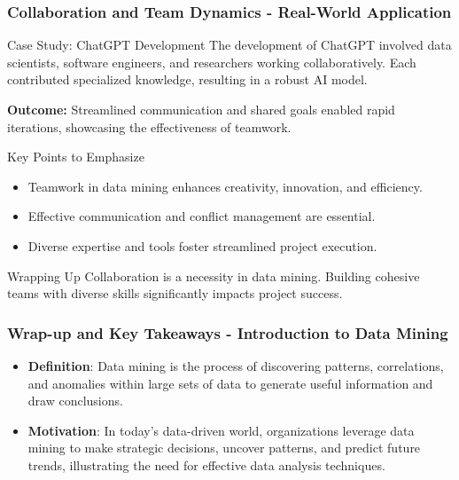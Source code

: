 \documentclass[aspectratio=169]{beamer}
\begin{document}
\begin{frame}[fragile]
    \frametitle{Collaboration and Team Dynamics - Real-World Application}
    \begin{block}{Case Study: ChatGPT Development}
        The development of ChatGPT involved data scientists, software engineers, and researchers working collaboratively. Each contributed specialized knowledge, resulting in a robust AI model.
        
        \textbf{Outcome:} Streamlined communication and shared goals enabled rapid iterations, showcasing the effectiveness of teamwork.
    \end{block}
    
    \begin{block}{Key Points to Emphasize}
        \begin{itemize}
            \item Teamwork in data mining enhances creativity, innovation, and efficiency.
            \item Effective communication and conflict management are essential.
            \item Diverse expertise and tools foster streamlined project execution.
        \end{itemize}
    \end{block}
    
    \begin{block}{Wrapping Up}
        Collaboration is a necessity in data mining. Building cohesive teams with diverse skills significantly impacts project success. 
    \end{block}
\end{frame}

\begin{frame}[fragile]
    \frametitle{Wrap-up and Key Takeaways - Introduction to Data Mining}
    \begin{itemize}
        \item \textbf{Definition}: Data mining is the process of discovering patterns, correlations, and anomalies within large sets of data to generate useful information and draw conclusions.
        \item \textbf{Motivation}: In today’s data-driven world, organizations leverage data mining to make strategic decisions, uncover patterns, and predict future trends, illustrating the need for effective data analysis techniques.
    \end{itemize}
\end{frame}
\end{document}
